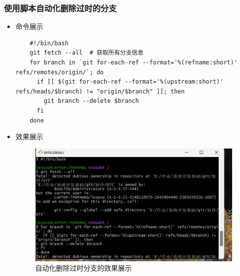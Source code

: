 \documentclass[UTF8]{ctexart}
\begin{document}
\begin{itemize}
\begin{figure}[H]
  \end{figure}
\end{itemize}

\subsubsection{使用脚本自动化删除过时的分支}
\begin{itemize}
  \item 命令展示
  \begin{verbatim}
    #!/bin/bash
    git fetch --all  # 获取所有分支信息
    for branch in `git for-each-ref --format='%(refname:short)' refs/remotes/origin/`; do
      if [[ $(git for-each-ref --format='%(upstream:short)' refs/heads/$branch) != "origin/$branch" ]]; then
        git branch --delete $branch
      fi
    done
  \end{verbatim}

  \item 效果展示
  \begin{figure}[H]
    \centering
    \includegraphics[width=\textwidth]{21} %
    \caption{自动化删除过时分支的效果展示}
    \label{fig:delete-branches}
  \end{figure}
\end{itemize}
\end{document}
